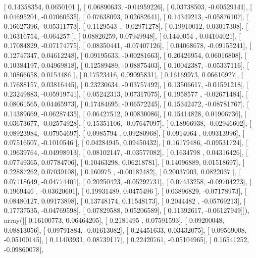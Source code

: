 \documentclass{article}
\begin{document}
       [ 0.14358354,  0.0650101 ],
       [ 0.06890633, -0.04959226],
       [ 0.03738503, -0.00529141],
       [ 0.04695201, -0.07060535],
       [ 0.07638093,  0.02682641],
       [ 0.14349213, -0.05876107],
       [ 0.16627396, -0.05311773],
       [ 0.1129543 , -0.02971278],
       [ 0.19910012,  0.03017308],
       [ 0.16316754, -0.064257  ],
       [ 0.08826259,  0.07949948],
       [ 0.1440054 ,  0.04104021],
       [ 0.17084829, -0.07174775],
       [ 0.08350441, -0.07407126],
       [ 0.04068678, -0.09155241],
       [ 0.12747347,  0.04612248],
       [ 0.09195633, -0.00281663],
       [ 0.20426954,  0.06016808],
       [ 0.10384197,  0.04969818],
       [ 0.12589489, -0.08875403],
       [ 0.10042387, -0.05337116],
       [ 0.10866658,  0.0154486 ],
       [ 0.17523416,  0.09095831],
       [ 0.16169973,  0.06610927],
       [ 0.17688157,  0.03816445],
       [ 0.23230634, -0.03757492],
       [ 0.13506617, -0.01591218],
       [ 0.23249883, -0.05919741],
       [ 0.05242313,  0.07317075],
       [ 0.1958577 , -0.02671484],
       [ 0.08061565,  0.04465973],
       [ 0.17484695, -0.06572245],
       [ 0.15342472, -0.08781767],
       [ 0.14389669, -0.06287435],
       [ 0.06427512,  0.00830086],
       [ 0.15414828,  0.01906736],
       [ 0.03673677, -0.02574928],
       [ 0.15351106, -0.07647097],
       [ 0.18966938, -0.02946602],
       [ 0.08923984, -0.07954697],
       [ 0.0985794 ,  0.09280968],
       [ 0.0914064 ,  0.09313996],
       [ 0.07516507, -0.1010546 ],
       [ 0.04284945,  0.09450432],
       [ 0.16179486, -0.09531724],
       [ 0.19639764, -0.04998913],
       [ 0.08102147, -0.03577082],
       [ 0.1634798 ,  0.04316426],
       [ 0.07749365,  0.07784706],
       [ 0.10463298,  0.06218781],
       [ 0.14096889,  0.01518697],
       [ 0.22887262,  0.07039108],
       [ 0.160975  , -0.00182482],
       [ 0.20037903,  0.0822037 ],
       [ 0.07118649, -0.04774401],
       [ 0.20250423, -0.05292731],
       [ 0.07433258, -0.09704223],
       [ 0.1969446 , -0.03620601],
       [ 0.19931489,  0.0475496 ],
       [ 0.03896829, -0.07178973],
       [ 0.08480127,  0.09173898],
       [ 0.13748174,  0.11548173],
       [ 0.2044482 , -0.05769213],
       [ 0.17737535, -0.04769598],
       [ 0.07829588,  0.05206589],
       [ 0.11392617, -0.06127949]]), array([[ 0.16100773,  0.06464205],
       [ 0.2181495 ,  0.07591593],
       [ 0.09200048,  0.08813056],
       [ 0.09791884, -0.01613082],
       [ 0.24451633,  0.03432075],
       [ 0.09569008, -0.05100145],
       [ 0.11403931,  0.08739117],
       [ 0.22420761, -0.05104965],
       [ 0.16541252, -0.09860078],
\end{document}
